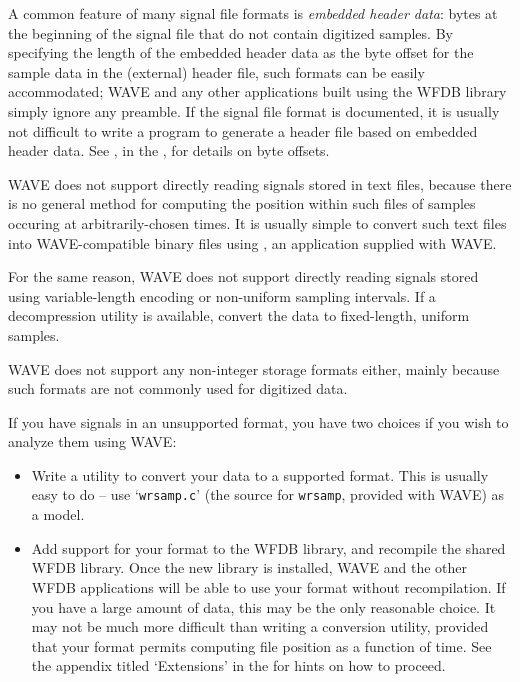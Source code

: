 \documentclass[twoside]{book}
\newcommand{\WAVE}{{\sf WAVE}\xspace}
\begin{document}
A common feature of many signal file formats is \emph{embedded header
data}:  bytes at the beginning of the signal file that do not contain
digitized samples.  By specifying the length of the embedded header
data as the byte offset for the sample data in the (external) header
file, such formats can be easily accommodated;  \WAVE{} and any other
applications built using the WFDB library simply ignore any preamble.
If the signal file format is documented, it is usually not difficult to
write a program to generate a header file based on embedded header
data.  See
, in the 
,
for details on byte offsets.

\WAVE{} does not support directly reading signals stored in text files, because
there is no general method for computing the position within such files of
samples occuring at arbitrarily-chosen times.  It is usually simple to convert
such text files into \WAVE{}-compatible binary files using
,
an application supplied with \WAVE{}.

For the same reason, \WAVE{} does not support directly reading signals stored
using variable-length encoding or non-uniform sampling intervals.  If a
decompression utility is available, convert the data to fixed-length, uniform
samples.

\WAVE{} does not support any non-integer storage formats either, mainly because
such formats are not commonly used for digitized data.

If you have signals in an unsupported format, you have two choices if you wish
to analyze them using \WAVE{}:

\begin{itemize}

\item
Write a utility to convert your data to a supported format.  This is usually
easy to do -- use `{\tt wrsamp.c}' (the source for {\tt wrsamp}, provided with
\WAVE{}) as a model.

\item
Add support for your format to the WFDB library, and recompile the shared WFDB
library.  Once the new library is installed, \WAVE{} and the other WFDB
applications will be able to use your format without recompilation.
If you have a large amount of data, this may be the only reasonable choice.
It may not be much more difficult than writing a conversion utility,
provided that your format permits computing file position as a function of
time.  See the appendix titled `{\sf Extensions}' in the 
for hints on how to proceed.
\end{itemize}
\end{document}
